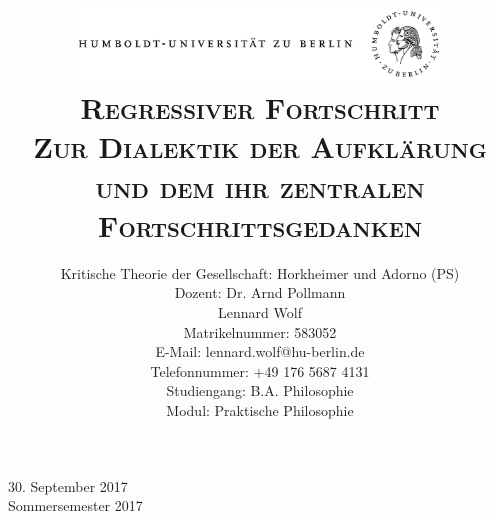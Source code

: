 \documentclass[a4paper, 12pt]{article}
\date{\vspace{-3ex}}
\begin{document}
\title{\vspace{5ex}
	\includegraphics*[bb=0 0 720 200, width=0.72\textwidth]{ErstesSem/images/hu_logo.png}\\
	\vspace{30pt}
	\scshape\LARGE{Regressiver Fortschritt}\\\Large{Zur Dialektik der Aufklärung und dem ihr zentralen Fortschrittsgedanken}\\\vspace{20pt}}
	


\author{Kritische Theorie der Gesellschaft: Horkheimer und Adorno (PS)\\
	\vspace{7pt}
          Dozent: Dr. Arnd Pollmann\\\vspace{4pt}Lennard Wolf\\
        \small{Matrikelnummer: 583052}\\
        \small{E-Mail: lennard.wolf@hu-berlin.de}\\
        \small{Telefonnummer: +49 176 5687 4131}\\
        \small{Studiengang: B.A. Philosophie}\\
        \small{Modul: Praktische Philosophie}}


\maketitle

\vspace{\fill}

\begin{minipage}[]{0.92\textwidth}
    \centering
    \onehalfspacing
    \large   
    30. September 2017\\
    Sommersemester 2017

    \vspace{-20mm} 
\end{minipage}%
\thispagestyle{empty}
\newpage
\setcounter{page}{1}
\end{document}
